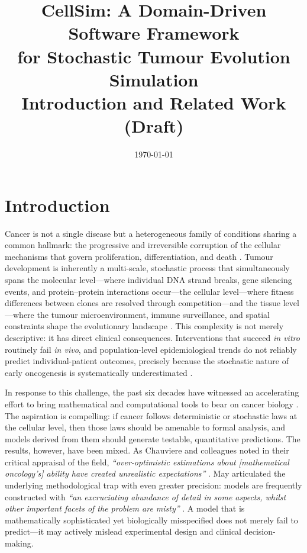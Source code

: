 \documentclass[12pt,a4paper]{article}
\title{\textbf{CellSim: A Domain-Driven Software Framework\\
for Stochastic Tumour Evolution Simulation}\\[0.5em]
\large Introduction and Related Work (Draft)}
\author{}
\date{\today}
\begin{document}
\maketitle
\tableofcontents
\newpage

\section{Introduction}
\label{sec:introduction}

Cancer is not a single disease but a heterogeneous family of conditions sharing a
common hallmark: the progressive and irreversible corruption of the cellular
mechanisms that govern proliferation, differentiation, and death
\cite{veneziano2025, chauviere2010}.
Tumour development is inherently a multi-scale, stochastic process that simultaneously
spans the molecular level---where individual DNA strand breaks, gene silencing events,
and protein–protein interactions occur---the cellular level---where
fitness differences between clones are resolved through competition---and the tissue
level---where the tumour microenvironment, immune surveillance, and spatial constraints
shape the evolutionary landscape \cite{su2024, hassan2024}.
This complexity is not merely descriptive: it has direct clinical consequences.
Interventions that succeed \emph{in vitro} routinely fail \emph{in vivo}, and
population-level epidemiological trends do not reliably predict individual-patient
outcomes, precisely because the stochastic nature of early oncogenesis is systematically
underestimated \cite{chauviere2010}.

In response to this challenge, the past six decades have witnessed an accelerating
effort to bring mathematical and computational tools to bear on cancer biology
\cite{pugh2025, chauviere2010}.
The aspiration is compelling: if cancer follows deterministic or stochastic laws at
the cellular level, then those laws should be amenable to formal analysis, and
models derived from them should generate testable, quantitative predictions.
The results, however, have been mixed.
As Chauviere and colleagues noted in their critical appraisal of the field,
\textit{``over-optimistic estimations about [mathematical oncology's] ability have
created unrealistic expectations''} \cite{chauviere2010}.
May articulated the underlying methodological trap with even greater precision:
models are frequently constructed with \textit{``an excruciating abundance of
detail in some aspects, whilst other important facets of the problem are misty''}
\cite{may2004}.
A model that is mathematically sophisticated yet biologically misspecified does not
merely fail to predict---it may actively mislead experimental design and clinical
decision-making.
\end{document}

